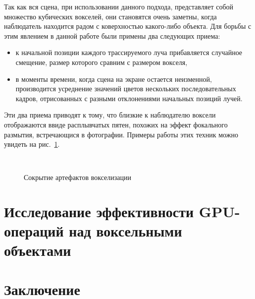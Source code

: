 \documentclass[a4paper,14pt]{extreport}
\begin{document}
Так как вся сцена, при использовании данного подхода, представляет собой множество кубических вокселей, они становятся очень заметны, когда наблюдатель находится радом с коверхностью какого-либо объекта. Для борьбы с этим явлением в данной работе были примены два следующих приема:
\begin{itemize}
\item к начальной позиции каждого трассируемого луча прибавляется случайное смещение, размер которого сравним с размером вокселя,
\item в моменты времени, когда сцена на экране остается неизменной, производится усреднение значений цветов нескольких последовательных кадров, отрисованных с разными отклонениями начальных позиций лучей.
\end{itemize}
Эти два приема приводят к тому, что близкие к наблюдателю воксели отображаются ввиде расплывчатых пятен, похожих на эффект фокального размытия, встречающися в фотографии. Примеры работы этих техник можно увидеть на рис.~\ref{fig:voxel_blur}.

\begin{figure}[h]
  \begin{center}
     \\
  \end{center}
  \caption{Сокрытие артефактов вокселизации}
  \label{fig:voxel_blur}
\end{figure}

\chapter{Исследование эффективности GPU-операций над воксельными объектами}



\chapter*{Заключение}


\appendix
\renewcommand{\appendixname}{Приложение}



\end{document}
